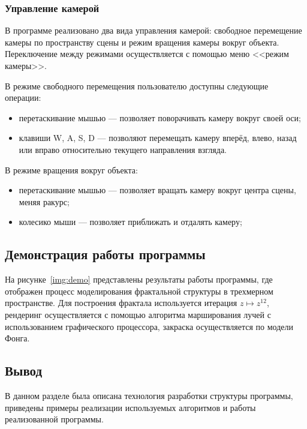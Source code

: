\subsubsection{Управление камерой}

В программе реализовано два вида управления камерой: свободное перемещение камеры по пространству сцены и режим вращения камеры вокруг объекта.
Переключение между режимами осуществляется с помощью меню <<режим камеры>>.

В режиме свободного перемещения пользователю доступны следующие операции:

\begin{itemize}
  \item перетаскивание мышью --- позволяет поворачивать камеру вокруг своей оси;
  \item клавиши W, A, S, D --- позволяют перемещать камеру вперёд, влево, назад или вправо относительно текущего направления взгляда.
\end{itemize}

В режиме вращения вокруг объекта:

\begin{itemize}
  \item перетаскивание мышью --- позволяет вращать камеру вокруг центра сцены, меняя ракурс;
  \item колесико мыши --- позволяет приближать и отдалять камеру;
\end{itemize}

\subsection{Демонстрация работы программы}

На рисунке~\ref{img:demo} представлены результаты работы программы, где отображен процесс моделирования фрактальной структуры
в трехмерном пространстве. Для построения фрактала используется итерация $z \mapsto z^{12}$, рендеринг осуществляется с помощью
алгоритма марширования лучей с использованием графического процессора, закраска осуществляется по модели Фонга.


\subsection*{Вывод}
В данном разделе была описана технология разработки структуры программы, приведены примеры реализации
используемых алгоритмов и работы реализованной программы.
